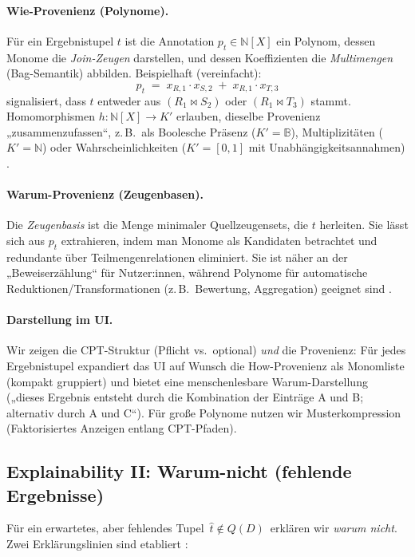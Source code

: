 \paragraph{Wie-Provenienz (Polynome).}
Für ein Ergebnistupel \(t\) ist die Annotation \(p_t \in \mathbb{N}[X]\) ein Polynom, dessen Monome die \emph{Join-Zeugen} darstellen, und dessen Koeffizienten die \emph{Multimengen} (Bag-Semantik) abbilden. Beispielhaft (vereinfacht):
\[
p_t \;=\; x_{R,1}\!\cdot\!x_{S,2} \;+\; x_{R,1}\!\cdot\!x_{T,3}
\]
signalisiert, dass \(t\) entweder aus \((R_1 \Join S_2)\) oder \((R_1 \Join T_3)\) stammt. Homomorphismen \(h: \mathbb{N}[X]\!\to\!K'\) erlauben, dieselbe Provenienz „zusammenzufassen“, z.\,B.\ als Boolesche Präsenz (\(K'=\mathbb{B}\)), Multiplizitäten (\(K'=\mathbb{N}\)) oder Wahrscheinlichkeiten (\(K'=[0,1]\) mit Unabhängigkeitsannahmen) \cite{green2007provenance}.

\paragraph{Warum-Provenienz (Zeugenbasen).}
Die \emph{Zeugenbasis} ist die Menge minimaler Quellzeugensets, die \(t\) herleiten. Sie lässt sich aus \(p_t\) extrahieren, indem man Monome als Kandidaten betrachtet und redundante über Teilmengenrelationen eliminiert. Sie ist näher an der „Beweiserzählung“ für Nutzer:innen, während Polynome für automatische Reduktionen/Transformationen (z.\,B.\ Bewertung, Aggregation) geeignet sind \cite{green2007provenance,herschel2017survey}.

\paragraph{Darstellung im UI.}
Wir zeigen die CPT-Struktur (Pflicht vs.\ optional) \emph{und} die Provenienz: Für jedes Ergebnistupel expandiert das UI auf Wunsch die How-Provenienz als Monomliste (kompakt gruppiert) und bietet eine menschenlesbare Warum-Darstellung („dieses Ergebnis entsteht durch die Kombination der Einträge A und B; alternativ durch A und C“). Für große Polynome nutzen wir Musterkompression (Faktorisiertes Anzeigen entlang CPT-Pfaden).


\subsection{Explainability II: Warum-nicht (fehlende Ergebnisse)}
\label{sec:explain-why-not}

Für ein erwartetes, aber fehlendes Tupel \(\,\hat{t}\notin Q(D)\,\) erklären wir \emph{warum nicht}. Zwei Erklärungslinien sind etabliert \cite{herschel2017survey}:

